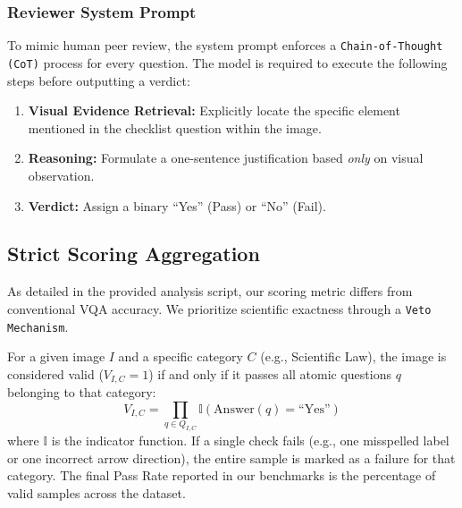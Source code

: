 \documentclass[runningheads]{llncs}
\begin{document}
\subsubsection{Reviewer System Prompt}
To mimic human peer review, the system prompt enforces a \texttt{Chain-of-Thought (CoT)} process for every question. The model is required to execute the following steps before outputting a verdict:
\begin{enumerate}
    \item \textbf{Visual Evidence Retrieval:} Explicitly locate the specific element mentioned in the checklist question within the image.
    \item \textbf{Reasoning:} Formulate a one-sentence justification based \textit{only} on visual observation.
    \item \textbf{Verdict:} Assign a binary ``Yes'' (Pass) or ``No'' (Fail).
\end{enumerate}

\subsection{Strict Scoring Aggregation}
As detailed in the provided analysis script, our scoring metric differs from conventional VQA accuracy. We prioritize scientific exactness through a \texttt{Veto Mechanism}.

For a given image $I$ and a specific category $C$ (e.g., Scientific Law), the image is considered valid ($V_{I,C} = 1$) if and only if it passes all atomic questions $q$ belonging to that category:
\begin{equation}
    V_{I,C} = \prod_{q \in Q_{I,C}} \mathbb{I}(\text{Answer}(q) = \text{``Yes''})
\end{equation}
where $\mathbb{I}$ is the indicator function. If a single check fails (e.g., one misspelled label or one incorrect arrow direction), the entire sample is marked as a failure for that category. The final Pass Rate reported in our benchmarks is the percentage of valid samples across the dataset.
\end{document}
